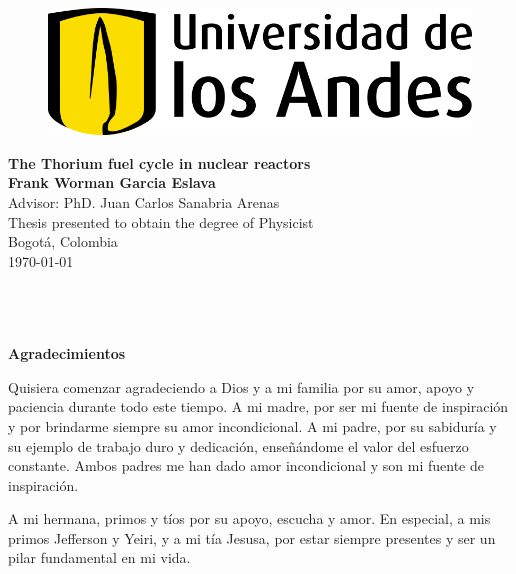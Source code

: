 
\begin{center}
\begin{figure}
    \centering%
    \includegraphics[scale=0.35]{HojaTitulo/Figures_HojaTitulo/Universidad_de_los_Andes_(logo).png} %
\end{figure}
\thispagestyle{empty} \vspace*{2.0cm} \textbf{\LARGE
The Thorium fuel cycle in nuclear reactors}\\[2.5cm]

\Large\textbf{Frank Worman Garcia Eslava}\\[2.0cm]

Advisor: PhD. Juan Carlos Sanabria Arenas \\[2.0cm]


\Large Thesis presented to obtain the degree of Physicist \\ [2.0cm]


Bogot\'{a}, Colombia\\ [0.5cm]
\today \\
\end{center}

\newpage{\pagestyle{empty}\cleardoublepage}

\newpage
\thispagestyle{empty} \textbf{}\normalsize
\\\\\\%
\textbf{\LARGE Agradecimientos}\\

Quisiera comenzar agradeciendo a Dios y a mi familia por su amor, apoyo y paciencia durante todo este tiempo. A mi madre, por ser mi fuente de inspiración y por brindarme siempre su amor incondicional. A mi padre, por su sabiduría y su ejemplo de trabajo duro y dedicación, enseñándome el valor del esfuerzo constante. Ambos padres me han dado amor incondicional y son mi fuente de inspiración.

A mi hermana, primos y tíos por su apoyo, escucha y amor. En especial, a mis primos Jefferson y Yeiri, y a mi tía Jesusa, por estar siempre presentes y ser un pilar fundamental en mi vida.

